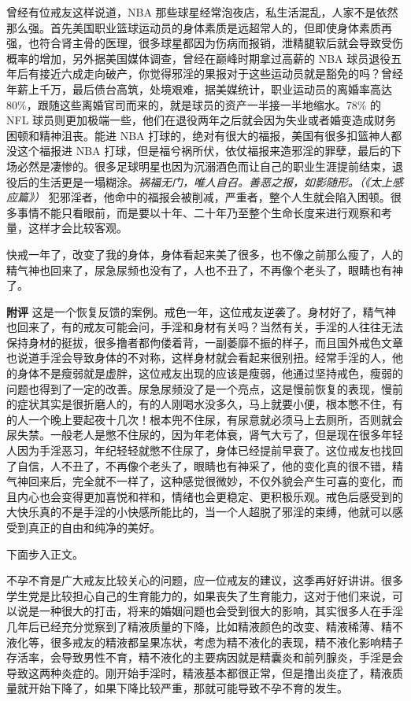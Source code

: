 \begin{case}
    曾经有位戒友这样说道，NBA 那些球星经常泡夜店，私生活混乱，人家不是依然那么强。首先美国职业篮球运动员的身体素质是远超常人的，但即使身体素质再强，也符合肾主骨的医理，很多球星都因为伤病而报销，泄精腿软后就会导致受伤概率的增加，另外据美国媒体调查，曾经在巅峰时期拿过高薪的 NBA 球员退役五年后有接近六成走向破产，你觉得邪淫的果报对于这些运动员就是豁免的吗？曾经年薪上千万，最后债台高筑，处境艰难，据美媒统计，职业运动员的离婚率高达 80\%，跟随这些离婚官司而来的，就是球员的资产一半接一半地缩水。78\% 的 NFL 球员则更加极端一些，他们在退役两年之后就会因为失业或者婚变造成财务困顿和精神沮丧。能进 NBA 打球的，绝对有很大的福报，美国有很多扣篮神人都没这个福报进 NBA 打球，但是福兮祸所伏，依仗福报来造邪淫的罪孽，最后的下场必然是凄惨的。很多足球明星也因为沉溺酒色而让自己的职业生涯提前结束，退役后的生活更是一塌糊涂。\textit{祸福无门，唯人自召。善恶之报，如影随形。（《太上感应篇》）} 犯邪淫者，他命中的福报会被削减，严重者，整个人生就会陷入困顿。很多事情不能只看眼前，而是要以十年、二十年乃至整个生命长度来进行观察和考量，这样才会比较客观。
\end{case}

\begin{case}
    快戒一年了，改变了我的身体，身体看起来美了很多，也不像之前那么瘦了，人的精气神也回来了，尿急尿频也没有了，人也不丑了，不再像个老头了，眼睛也有神了。

    \textbf{附评} 这是一个恢复反馈的案例。戒色一年，这位戒友逆袭了。身材好了，精气神也回来了，有的戒友可能会问，手淫和身材有关吗？当然有关，手淫的人往往无法保持身材的挺拔，很多撸者都佝偻着背，一副萎靡不振的样子，而且国外戒色文章也说道手淫会导致身体的不对称，这样身材就会看起来很别扭。经常手淫的人，他的身体不是瘦弱就是虚胖，这位戒友出现的应该是瘦弱，他通过坚持戒色，瘦弱的问题也得到了一定的改善。尿急尿频没了是一个亮点，这是慢前恢复的表现，慢前的症状其实是很折磨人的，有的人刚喝水没多久，马上就要小便，根本憋不住，有的人一个晚上要起夜十几次！根本兜不住尿，有尿意就必须马上去厕所，否则就会尿失禁。一般老人是憋不住尿的，因为年老体衰，肾气大亏了，但是现在很多年轻人因为手淫恶习，年纪轻轻就憋不住尿了，身体已经提前早衰了。这位戒友也找回了自信，人不丑了，不再像个老头了，眼睛也有神采了，他的变化真的很不错，精气神回来后，完全就不一样了，这种感觉很微妙，不仅外貌会产生可喜的变化，而且内心也会变得更加喜悦和祥和，情绪也会更稳定、更积极乐观。戒色后感受到的大快乐真的不是手淫的小快感所能比的，当一个人超脱了邪淫的束缚，他就可以感受到真正的自由和纯净的美好。
\end{case}

下面步入正文。

不孕不育是广大戒友比较关心的问题，应一位戒友的建议，这季再好好讲讲。很多学生党是比较担心自己的生育能力的，如果丧失了生育能力，这对于他们来说，可以说是一种很大的打击，将来的婚姻问题也会受到很大的影响，其实很多人在手淫几年后已经充分觉察到了精液质量的下降，比如精液颜色的改变、精液稀薄、精不液化等，很多戒友的精液都呈果冻状，考虑为精不液化的表现，精不液化影响精子存活率，会导致男性不育，精不液化的主要病因就是精囊炎和前列腺炎，手淫是会导致这两种炎症的。刚开始手淫时，精液基本都很正常，但是撸出炎症了，精液质量就开始下降了，如果下降比较严重，那就可能导致不孕不育的发生。

